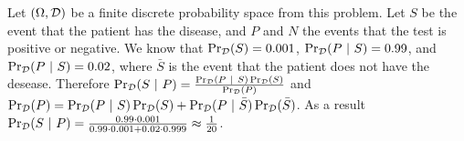 Let $(\Omega, \mathcal{D})$ be a finite discrete probability space from
this problem.
Let $S$ be the event that the patient has the disease, and $P$ and $N$ the
events that the test is positive or negative. We know that
$\Pr_{\mathcal{D}}(S) = 0.001$,
$\Pr_{\mathcal{D}}(P ~\rvert~ S) = 0.99$, and 
$\Pr_{\mathcal{D}}(P ~\rvert~ S) = 0.02$, where $\bar{S}$ is the
event that the patient does not have the desease. Therefore 
$\Pr_{\mathcal{D}}(S ~\rvert~ P) = 
\frac{
  \Pr_{\mathcal{D}}(P ~\rvert~ S) \Pr_{\mathcal{D}}(S)
}{
  \Pr_{\mathcal{D}}(P)
}$ 
and 
$\Pr_{\mathcal{D}}(P) = 
  \Pr_{\mathcal{D}}(P ~\rvert~ S) \Pr_{\mathcal{D}}(S) + 
  \Pr_{\mathcal{D}}(P ~\rvert~ \bar{S}) \Pr_{\mathcal{D}}(\bar{S})$. 
As a result $\Pr_{\mathcal{D}}(S ~\rvert~ P) =  
\frac{0.99 \cdot 0.001}{0.99 \cdot 0.001 + 0.02 \cdot 0.999} \approx \frac{1}{20}$.
